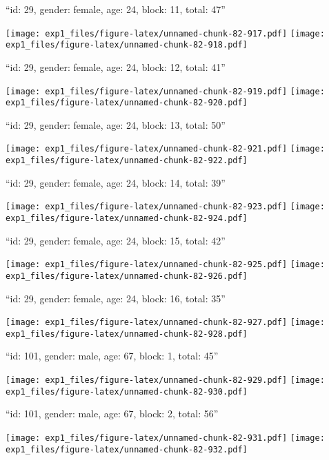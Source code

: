 \documentclass[11pt,,]{article}
\begin{document}
\newpage
[1] 

``id: 29, gender: female, age: 24, block: 11, total: 47''

\texttt{[image: exp1\_files/figure-latex/unnamed-chunk-82-917.pdf]}
\texttt{[image: exp1\_files/figure-latex/unnamed-chunk-82-918.pdf]}

\newpage
[1] 

``id: 29, gender: female, age: 24, block: 12, total: 41''

\texttt{[image: exp1\_files/figure-latex/unnamed-chunk-82-919.pdf]}
\texttt{[image: exp1\_files/figure-latex/unnamed-chunk-82-920.pdf]}

\newpage
[1] 

``id: 29, gender: female, age: 24, block: 13, total: 50''

\texttt{[image: exp1\_files/figure-latex/unnamed-chunk-82-921.pdf]}
\texttt{[image: exp1\_files/figure-latex/unnamed-chunk-82-922.pdf]}

\newpage
[1] 

``id: 29, gender: female, age: 24, block: 14, total: 39''

\texttt{[image: exp1\_files/figure-latex/unnamed-chunk-82-923.pdf]}
\texttt{[image: exp1\_files/figure-latex/unnamed-chunk-82-924.pdf]}

\newpage
[1] 

``id: 29, gender: female, age: 24, block: 15, total: 42''

\texttt{[image: exp1\_files/figure-latex/unnamed-chunk-82-925.pdf]}
\texttt{[image: exp1\_files/figure-latex/unnamed-chunk-82-926.pdf]}

\newpage
[1] 

``id: 29, gender: female, age: 24, block: 16, total: 35''

\texttt{[image: exp1\_files/figure-latex/unnamed-chunk-82-927.pdf]}
\texttt{[image: exp1\_files/figure-latex/unnamed-chunk-82-928.pdf]}

\newpage
[1] 

``id: 101, gender: male, age: 67, block: 1, total: 45''

\texttt{[image: exp1\_files/figure-latex/unnamed-chunk-82-929.pdf]}
\texttt{[image: exp1\_files/figure-latex/unnamed-chunk-82-930.pdf]}

\newpage
[1] 

``id: 101, gender: male, age: 67, block: 2, total: 56''

\texttt{[image: exp1\_files/figure-latex/unnamed-chunk-82-931.pdf]}
\texttt{[image: exp1\_files/figure-latex/unnamed-chunk-82-932.pdf]}
\end{document}
